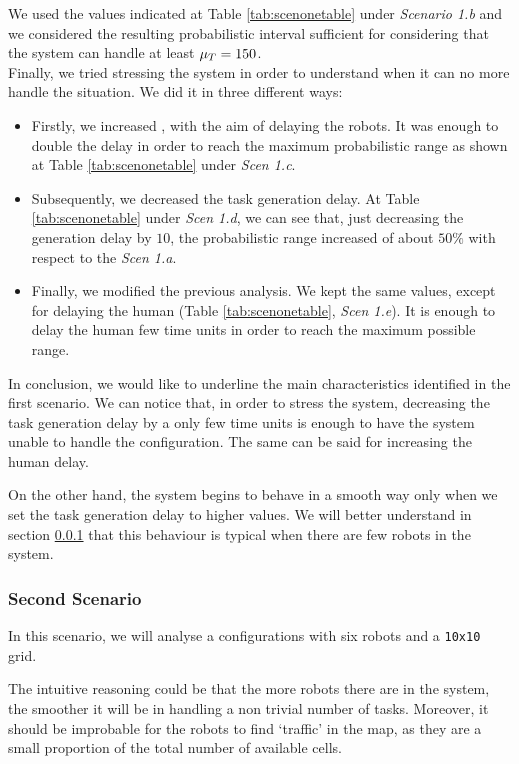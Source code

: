 We used the values indicated at Table \ref{tab:scenonetable} under \emph{Scenario 1.b} and we considered the resulting probabilistic interval sufficient for considering that the system can handle at least $\mu_T = 150$.
\\

Finally, we tried stressing the system in order to understand when it can no more handle the situation. We did it in three different ways:
\begin{itemize}
    \item Firstly, we increased \K, with the aim of delaying the robots. It was enough to double the delay in order to reach the maximum probabilistic range as shown at Table \ref{tab:scenonetable} under \emph{Scen 1.c}.
    \item Subsequently, we decreased the task generation delay. At Table \ref{tab:scenonetable} under \emph{Scen 1.d}, we can see that, just decreasing the generation delay by $10$, the probabilistic range increased of about $50\%$ with respect to the \emph{Scen 1.a}.
    \item Finally, we modified the previous analysis. We kept the same values, except for delaying the human (Table \ref{tab:scenonetable}, \emph{Scen 1.e}). It is enough to delay the human few time units in order to reach the maximum possible range.
\end{itemize}

In conclusion, we would like to underline the main characteristics identified in the first scenario. We can notice that, in order to stress the system, decreasing the task generation delay by a only few time units is enough to have the system unable to handle the configuration. The same can be said for increasing the human delay.

On the other hand, the system begins to behave in a smooth way only when we set the task generation delay to higher values. We will better understand in section \ref{secondscenario} that this behaviour is typical when there are few robots in the system.

\subsubsection{Second Scenario} \label{secondscenario}
In this scenario, we will analyse a configurations with six robots and a \texttt{10x10} grid.

The intuitive reasoning could be that the more robots there are in the system, the smoother it will be in handling a non trivial number of tasks. Moreover, it should be improbable for the robots to find `traffic' in the map, as they are a small proportion of the total number of available cells.

